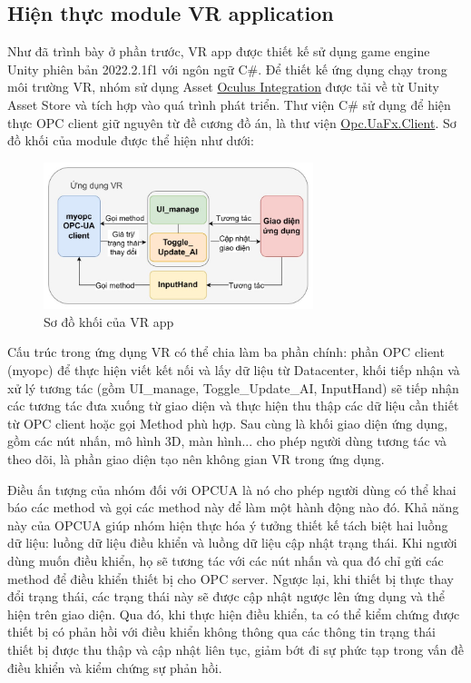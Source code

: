 \subsection{Hiện thực module VR application}

Như đã trình bày ở phần trước, VR app được thiết kế sử dụng game engine Unity phiên bản 2022.2.1f1 với ngôn ngữ C\#. Để thiết kế ứng dụng chạy trong môi trường VR, nhóm sử dụng Asset \href{https://assetstore.unity.com/packages/tools/integration/oculus-integration-82022}{Oculus Integration} được tải về từ Unity Asset Store và tích hợp vào quá trình phát triển. Thư viện C\# sử dụng để hiện thực OPC client giữ nguyên từ đề cương đồ án, là thư viện \href{https://www.nuget.org/packages/Opc.UaFx.Client/#readme-body-tab}{Opc.UaFx.Client}. Sơ đồ khối của module được thể hiện như dưới:

\begin{figure}[H]
    \centering
    \includegraphics[width=0.7\textwidth]{Images/Implementation/VRapp/VR_block.jpg}
    \caption{Sơ đồ khối của VR app}
    \label{fig:blocks_vr_app}
\end{figure}

Cấu trúc trong ứng dụng VR có thể chia làm ba phần chính: phần OPC client (myopc) để thực hiện viết kết nối và lấy dữ liệu từ Datacenter, khối tiếp nhận và xử lý tương tác (gồm UI\_manage, Toggle\_Update\_AI, InputHand) sẽ tiếp nhận các tương tác đưa xuống từ giao diện và thực hiện thu thập các dữ liệu cần thiết từ OPC client hoặc gọi Method phù hợp. Sau cùng là khối giao diện ứng dụng, gồm các nút nhấn, mô hình 3D, màn hình... cho phép người dùng tương tác và theo dõi, là phần giao diện tạo nên không gian VR trong ứng dụng. 

Điều ấn tượng của nhóm đối với OPCUA là nó cho phép người dùng có thể khai báo các method và gọi các method này để làm một hành động nào đó. Khả năng này của OPCUA giúp nhóm hiện thực hóa ý tưởng thiết kế tách biệt hai luồng dữ liệu: luồng dữ liệu điều khiển và luồng dữ liệu cập nhật trạng thái. Khi người dùng muốn điều khiển, họ sẽ tương tác với các nút nhấn và qua đó chỉ gửi các method để điều khiển thiết bị cho OPC server. Ngược lại, khi thiết bị thực thay đổi trạng thái, các trạng thái này sẽ được cập nhật ngược lên ứng dụng và thể hiện trên giao diện. Qua đó, khi thực hiện điều khiển, ta có thể kiểm chứng được thiết bị có phản hồi với điều khiển không thông qua các thông tin trạng thái thiết bị được thu thập và cập nhật liên tục, giảm bớt đi sự phức tạp trong vấn đề điều khiển và kiểm chứng sự phản hồi. 

